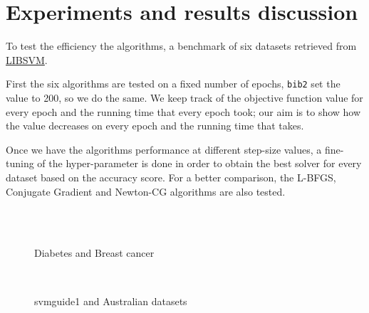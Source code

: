 \section{Experiments and results discussion}\label{sc:exp}




To test the efficiency the algorithms, a benchmark of six datasets retrieved from \href{https://www.csie.ntu.edu.tw/~cjlin/libsvmtools/datasets/}{LIBSVM}.

First the six algorithms are tested on a fixed number of epochs, \texttt{bib2} set the value to \num{200}, so we do the same. We keep track of the objective function value for every epoch and the running time that every epoch took; our aim is to show how the value decreases on every epoch and the running time that takes.

Once we have the algorithms performance at different step-size values, a fine-tuning of the hyper-parameter is done in order to obtain the best solver for every dataset based on the accuracy score. For a better comparison, the L-BFGS, Conjugate Gradient and Newton-CG algorithms are also tested.

\begin{figure}
\centering
 \\
 \\
\caption[]{Diabetes and Breast cancer}
\label{fig:diab-breast}
\end{figure}

\begin{figure}
\centering
 \\
\caption[]{svmguide1 and Australian datasets}
\label{fig:svm-austr}
\end{figure}

